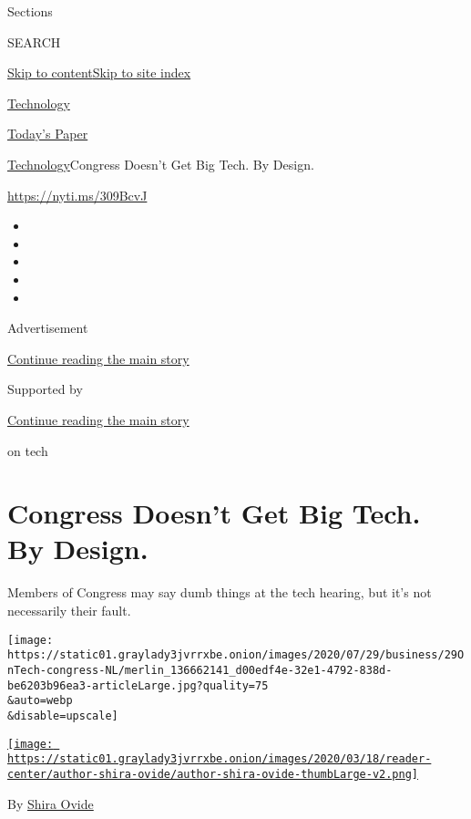 Sections

SEARCH

\protect\hyperlink{site-content}{Skip to
content}\protect\hyperlink{site-index}{Skip to site index}

\href{https://www.nytimes3xbfgragh.onion/section/technology}{Technology}

\href{https://myaccount.nytimes3xbfgragh.onion/auth/login?response_type=cookie\&client_id=vi}{}

\href{https://www.nytimes3xbfgragh.onion/section/todayspaper}{Today's
Paper}

\href{/section/technology}{Technology}\textbar{}Congress Doesn't Get Big
Tech. By Design.

\url{https://nyti.ms/309BcvJ}

\begin{itemize}
\item
\item
\item
\item
\item
\end{itemize}

Advertisement

\protect\hyperlink{after-top}{Continue reading the main story}

Supported by

\protect\hyperlink{after-sponsor}{Continue reading the main story}

on tech

\hypertarget{congress-doesnt-get-big-tech-by-design}{%
\section{Congress Doesn't Get Big Tech. By
Design.}\label{congress-doesnt-get-big-tech-by-design}}

Members of Congress may say dumb things at the tech hearing, but it's
not necessarily their fault.

\texttt{[image: https://static01.graylady3jvrrxbe.onion/images/2020/07/29/business/29OnTech-congress-NL/merlin\_136662141\_d00edf4e-32e1-4792-838d-be6203b96ea3-articleLarge.jpg?quality=75\\\&auto=webp\\\&disable=upscale]}

\href{https://www.nytimes3xbfgragh.onion/by/shira-ovide}{\texttt{[image: https://static01.graylady3jvrrxbe.onion/images/2020/03/18/reader-center/author-shira-ovide/author-shira-ovide-thumbLarge-v2.png]}}

By \href{https://www.nytimes3xbfgragh.onion/by/shira-ovide}{Shira Ovide}


